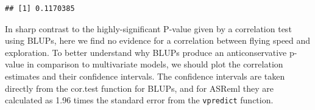 \documentclass[
  12pt,
]{book}
\newenvironment{Shaded}{\begin{snugshade}}{\end{snugshade}}
\newcommand{\AttributeTok}[1]{\textcolor[rgb]{0.77,0.63,0.00}{#1}}
\newcommand{\DecValTok}[1]{\textcolor[rgb]{0.00,0.00,0.81}{#1}}
\newcommand{\FloatTok}[1]{\textcolor[rgb]{0.00,0.00,0.81}{#1}}
\newcommand{\FunctionTok}[1]{\textcolor[rgb]{0.00,0.00,0.00}{#1}}
\newcommand{\NormalTok}[1]{#1}
\newcommand{\OtherTok}[1]{\textcolor[rgb]{0.56,0.35,0.01}{#1}}
\newcommand{\SpecialCharTok}[1]{\textcolor[rgb]{0.00,0.00,0.00}{#1}}
\newcommand{\StringTok}[1]{\textcolor[rgb]{0.31,0.60,0.02}{#1}}
\begin{document}
\begin{verbatim}
## [1] 0.1170385
\end{verbatim}

In sharp contrast to the highly-significant P-value given by a correlation test using BLUPs, here we find no evidence for a correlation between flying speed and exploration.
To better understand why BLUPs produce an anticonservative p-value in comparison to multivariate models, we should plot the correlation estimates and their confidence intervals. The confidence intervals are taken directly from the cor.test function for BLUPs, and for ASReml they are calculated as 1.96 times the standard error from the \texttt{vpredict} function.

\begin{Shaded}
\end{Shaded}
\end{document}
